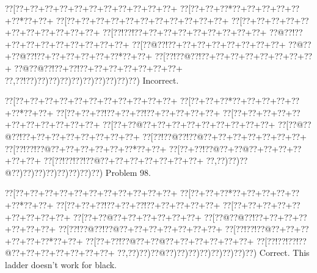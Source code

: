 \documentclass[a5paper]{article}
\begin{document}
\begin{center}
{\goo
\0??[\0??+\0??+\0??+\0??+\0??+\0??+\0??+\0??+\0??+\0??+\0??+
\0??[\0??+\0??+\0??*\0??+\0??+\0??+\0??+\0??+\0??*\0??+\0??+
\0??[\0??+\0??+\0??+\0??+\0??+\0??+\0??+\0??+\0??+\0??+\0??+
\0??[\0??+\0??+\0??+\0??+\0??+\0??+\0??+\0??+\0??+\0??+\0??+
\0??[\0??!\0??!\0??+\0??+\0??+\0??+\0??+\0??+\0??+\0??+\0??+
\0??@\0??!\0??+\0??+\0??+\0??+\0??+\0??+\0??+\0??+\0??+
\0??[\0??@\0??!\0??+\0??+\0??+\0??+\0??+\0??+\0??+\0??+
\0??@\0??+\0??@\0??!\0??+\0??+\0??+\0??+\0??+\0??*\0??+\0??+
\0??[\0??!\0??@\0??!\0??+\0??+\0??+\0??+\0??+\0??+\0??+\0??+
\0??@\0??@\0??!\0??+\0??!\0??+\0??+\0??+\0??+\0??+\0??+\0??+
\0??,\0??!\0??)\0??)\0??)\0??)\0??)\0??)\0??)\0??)\0??)\0??)
}
Incorrect. 

\end{center}
\newpage
\begin{center}
{\goo
\0??[\0??+\0??+\0??+\0??+\0??+\0??+\0??+\0??+\0??+\0??+\0??+
\0??[\0??+\0??+\0??*\0??+\0??+\0??+\0??+\0??+\0??*\0??+\0??+
\0??[\0??+\0??+\0??!\0??+\0??+\0??!\0??+\0??+\0??+\0??+\0??+
\0??[\0??+\0??+\0??+\0??+\0??+\0??+\0??+\0??+\0??+\0??+\0??+
\0??[\0??+\0??@\0??+\0??+\0??+\0??+\0??+\0??+\0??+\0??+\0??+
\0??[\0??@\0??@\0??!\0??+\0??+\0??+\0??+\0??+\0??+\0??+\0??+
\0??[\0??!\0??@\0??!\0??@\0??+\0??+\0??+\0??+\0??+\0??+\0??+
\0??[\0??!\0??!\0??@\0??+\0??+\0??+\0??+\0??+\0??*\0??+\0??+
\0??[\0??+\0??!\0??@\0??+\0??@\0??+\0??+\0??+\0??+\0??+\0??+
\0??[\0??!\0??!\0??!\0??@\0??+\0??+\0??+\0??+\0??+\0??+\0??+
\0??,\0??)\0??)\0??@\0??)\0??)\0??)\0??)\0??)\0??)\0??)\0??)
}
Problem 98.

\end{center}
\begin{center}
{\goo
\0??[\0??+\0??+\0??+\0??+\0??+\0??+\0??+\0??+\0??+\0??+\0??+
\0??[\0??+\0??+\0??*\0??+\0??+\0??+\0??+\0??+\0??*\0??+\0??+
\0??[\0??+\0??+\0??!\0??+\0??+\0??!\0??+\0??+\0??+\0??+\0??+
\0??[\0??+\0??+\0??+\0??+\0??+\0??+\0??+\0??+\0??+
\0??[\0??+\0??@\0??+\0??+\0??+\0??+\0??+\0??+
\0??[\0??@\0??@\0??!\0??+\0??+\0??+\0??+\0??+\0??+\0??+
\0??[\0??!\0??@\0??!\0??@\0??+\0??+\0??+\0??+\0??+\0??+\0??+
\0??[\0??!\0??!\0??@\0??+\0??+\0??+\0??+\0??+\0??*\0??+\0??+
\0??[\0??+\0??!\0??@\0??+\0??@\0??+\0??+\0??+\0??+\0??+\0??+
\0??[\0??!\0??!\0??!\0??@\0??+\0??+\0??+\0??+\0??+\0??+\0??+
\0??,\0??)\0??)\0??@\0??)\0??)\0??)\0??)\0??)\0??)\0??)\0??)
}
Correct. This ladder doesn't work for black.

\end{center}
\end{document}
